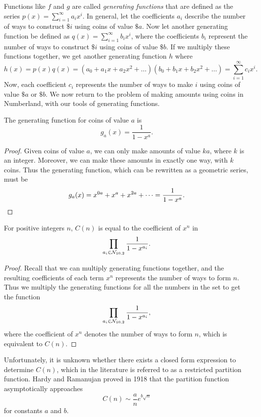 Functions like $f$ and $g$ are called \emph{generating functions} that are defined as the series $p(x) = \sum_{i=1}^{\infty} a_i x^i$. In general, let the coefficients $a_i$ describe the number of ways to construct $\$ i$ using coins of value $\$ a$. Now let another generating function be defined as $q(x) = \sum_{i=1}^{\infty} b_i x^i$, where the coefficients $b_i$ represent the number of ways to construct $\$ i$ using coins of value $\$ b$. If we multiply these functions together, we get another generating function $h$ where \[
  h(x) = p(x)q(x) = (a_0 + a_1x + a_2x^2 + \dots)(b_0 + b_1x + b_2x^2 + \dots) = \sum_{i=1}^{\infty} c_ix^{i}
.\] Now, each coefficient $c_i$ represents the number of ways to make $i$ using coins of value $\$ a$ or $\$ b$. We now return to the problem of making amounts using coins in Numberland, with our tools of generating functions.
\begin{theorem}
  The generating function for coins of value $a$ is \[
    g_a(x) = \frac{1}{1-x^a}
  .\] 
\end{theorem}
\begin{proof}
  Given coins of value $a$, we can only make amounts of value $ka$, where $k$ is an integer. Moreover, we can make these amounts in exactly one way, with $k$ coins. Thus the generating function, which can be rewritten as a geometric series, must be \[
    g_a(x) = x^{0a} + x^{a} + x^{2a} + \dots = \frac{1}{1-x^{a}}. \qedhere
  \] 
\end{proof}
\begin{theorem}
  For positive integers $n$, $C(n)$ is equal to the coefficient of $x^{n}$ in \[
    \prod_{a_i \in \mathcal{N}_{10, 2}} \frac{1}{1-x^{a_i}}
  .\] 
\end{theorem}
\begin{proof}
  Recall that we can multiply generating functions together, and the resulting coefficients of each term $x^{n}$ represents the number of ways to form $n$. Thus we multiply the generating functions for all the numbers in the set \NTen{} to get the function \[
    \prod_{a_i\in \mathcal{N}_{10, 2}} \frac{1}{1-x^{a_i}}
  ,\] where the coefficient of $x^n$ denotes the number of ways to form $n$, which is equivalent to $C(n)$.
\end{proof}
Unfortunately, it is unknown whether there exists a closed form expression to determine $C(n)$, which in the literature is referred to as a restricted partition function. Hardy and Ramanujan proved in 1918 \cite{hardyramanujan} that the partition function asymptotically approaches \[
  C(n) \sim \frac{a}{n}e^{b\sqrt{n}}
\] for constants $a$ and $b$.

